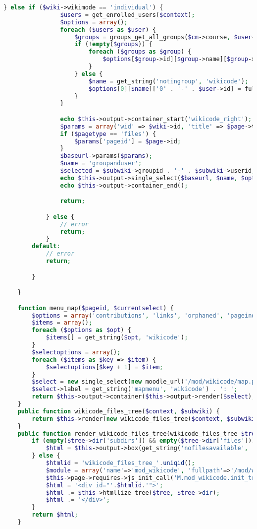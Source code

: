 \begin{lstlisting}[language=PHP]
            } else if ($wiki->wikimode == 'individual') {
                $users = get_enrolled_users($context);
                $options = array();
                foreach ($users as $user) {
                    $groups = groups_get_all_groups($cm->course, $user->id);
                    if (!empty($groups)) {
                        foreach ($groups as $group) {
                            $options[$group->id][$group->name][$group->id . '-' . $user->id] = fullname($user);
                        }
                    } else {
                        $name = get_string('notingroup', 'wikicode');
                        $options[0][$name]['0' . '-' . $user->id] = fullname($user);
                    }
                }

                echo $this->output->container_start('wikicode_right');
                $params = array('wid' => $wiki->id, 'title' => $page->title);
                if ($pagetype == 'files') {
                    $params['pageid'] = $page->id;
                }
                $baseurl->params($params);
                $name = 'groupanduser';
                $selected = $subwiki->groupid . '-' . $subwiki->userid;
                echo $this->output->single_select($baseurl, $name, $options, $selected);
                echo $this->output->container_end();

                return;

            } else {
                // error
                return;
            }
        default:
            // error
            return;

        }

    }

    function menu_map($pageid, $currentselect) {
        $options = array('contributions', 'links', 'orphaned', 'pageindex', 'pagelist', 'updatedpages');
        $items = array();
        foreach ($options as $opt) {
            $items[] = get_string($opt, 'wikicode');
        }
        $selectoptions = array();
        foreach ($items as $key => $item) {
            $selectoptions[$key + 1] = $item;
        }
        $select = new single_select(new moodle_url('/mod/wikicode/map.php', array('pageid' => $pageid)), 'option', $selectoptions, $currentselect);
        $select->label = get_string('mapmenu', 'wikicode') . ': ';
        return $this->output->container($this->output->render($select), 'midpad');
    }
    public function wikicode_files_tree($context, $subwiki) {
        return $this->render(new wikicode_files_tree($context, $subwiki));
    }
    public function render_wikicode_files_tree(wikicode_files_tree $tree) {
        if (empty($tree->dir['subdirs']) && empty($tree->dir['files'])) {
            $html = $this->output->box(get_string('nofilesavailable', 'repository'));
        } else {
            $htmlid = 'wikicode_files_tree_'.uniqid();
            $module = array('name'=>'mod_wikicode', 'fullpath'=>'/mod/wikicode/module.js');
            $this->page->requires->js_init_call('M.mod_wikicode.init_tree', array(false, $htmlid), false, $module);
            $html = '<div id="'.$htmlid.'">';
            $html .= $this->htmllize_tree($tree, $tree->dir);
            $html .= '</div>';
        }
        return $html;
    }


\end{lstlisting}
